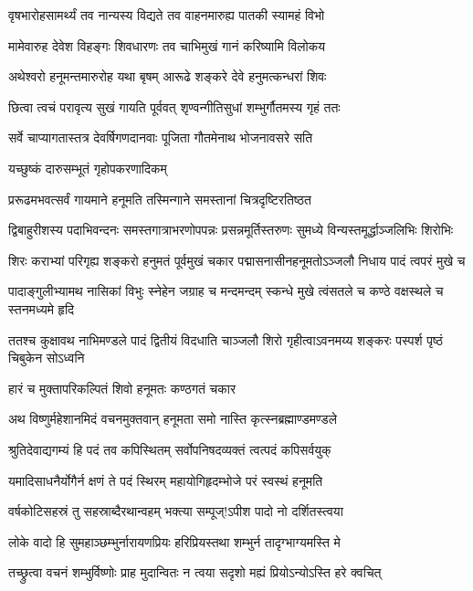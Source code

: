 \twolineshloka
{वृषभारोहसामर्थ्यं तव नान्यस्य विद्यते}
{तव वाहनमारुह्य पातकी स्यामहं विभो}%

\twolineshloka
{मामेवारुह देवेश विहङ्गः शिवधारणः}
{तव चाभिमुखं गानं करिष्यामि विलोकय}%

\twolineshloka
{अथेश्वरो हनूमन्तमारुरोह यथा बृषम्}
{आरूढे शङ्करे देवे हनुमत्कन्धरां शिवः}%

\twolineshloka
{छित्वा त्वचं परावृत्य सुखं गायति पूर्ववत्}
{शृण्वन्गीतिसुधां शम्भुर्गौतमस्य गृहं ततः}%

\twolineshloka
{सर्वे चाप्यागतास्तत्र देवर्षिगणदानवाः}
{पूजिता गौतमेनाथ भोजनावसरे सति}%

\twolineshloka
{यच्छुष्कं दारुसम्भूतं गृहोपकरणादिकम्}

\twolineshloka
{प्ररूढमभवत्सर्वं गायमाने हनूमति}%
{तस्मिन्गाने समस्तानां चित्रदृष्टिरतिष्ठत}%

\twolineshloka
{द्विबाहुरीशस्य पदाभिवन्दनः समस्तगात्राभरणोपपन्नः}
{प्रसन्नमूर्तिस्तरुणः सुमध्ये विन्यस्तमूर्द्धाञ्जलिभिः शिरोभिः}%

\twolineshloka
{शिरः कराभ्यां परिगृह्य शङ्करो हनुमतं पूर्वमुखं चकार}
{पद्मासनासीनहनूमतोऽञ्जलौ निधाय पादं त्वपरं मुखे च}%

\twolineshloka
{पादाङ्गुलीभ्यामथ नासिकां विभुः स्नेहेन जग्राह च मन्दमन्दम्}
{स्कन्धे मुखे त्वंसतले च कण्ठे वक्षस्थले च स्तनमध्यमे हृदि}%

\twolineshloka
{ततश्च कुक्षावथ नाभिमण्डले पादं द्वितीयं विदधाति चाञ्जलौ}
{शिरो गृहीत्वाऽवनमय्य शङ्करः पस्पर्श पृष्ठं चिबुकेन सोऽध्वनि}%

\onelineshloka
{हारं च मुक्तापरिकल्पितं शिवो हनूमतः कण्ठगतं चकार}%

\twolineshloka
{अथ विष्णुर्महेशानमिदं वचनमुक्तवान्}
{हनूमता समो नास्ति कृत्स्नब्रह्माण्डमण्डले}%

\twolineshloka
{श्रुतिदेवाद्यगम्यं हि पदं तव कपिस्थितम्}
{सर्वोपनिषदव्यक्तं त्वत्पदं कपिसर्वयुक्}%

\twolineshloka
{यमादिसाधनैर्योगैर्न क्षणं ते पदं स्थिरम्}
{महायोगिहृदम्भोजे परं स्वस्थं हनूमति}%

\twolineshloka
{वर्षकोटिसहस्रं तु सहस्राब्दैरथान्वहम्}
{भक्त्या सम्पूज्!ऽपीश पादो नो दर्शितस्त्वया}%

\twolineshloka
{लोके वादो हि सुमहाञ्छम्भुर्नारायणप्रियः}
{हरिप्रियस्तथा शम्भुर्न तादृग्भाग्यमस्ति मे}%

\twolineshloka
{तच्छ्रुत्वा वचनं शम्भुर्विष्णोः प्राह मुदान्वितः}
{न त्वया सदृशो मह्यं प्रियोऽन्योऽस्ति हरे क्वचित्}%

